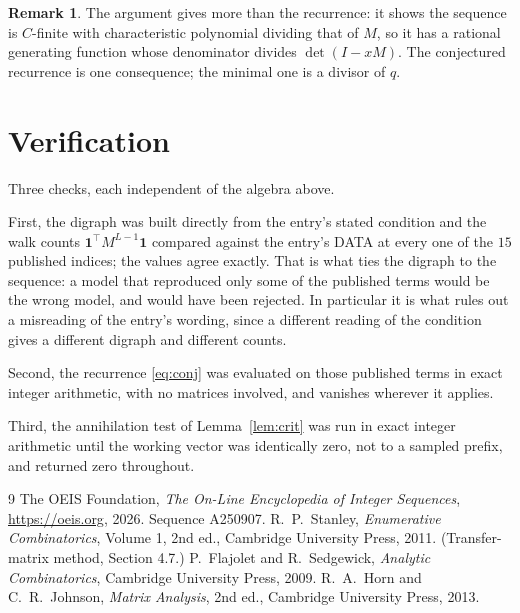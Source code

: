 \documentclass[11pt,a4paper]{article}
\theoremstyle{plain}
\theoremstyle{definition}
\newtheorem{remark}[theorem]{Remark}
\begin{document}
\begin{remark}
The argument gives more than the recurrence: it shows the sequence is $C$-finite with
characteristic polynomial dividing that of $M$, so it has a rational generating function
whose denominator divides $\det(I-xM)$. The conjectured recurrence is one consequence; the
minimal one is a divisor of $q$.
\end{remark}

\section{Verification}

Three checks, each independent of the algebra above.

First, the digraph was built directly from the entry's stated condition and the walk counts
$\mathbf{1}^{\!\top}M^{L-1}\mathbf{1}$ compared against the entry's DATA at
every one of the $15$ published indices; the values agree exactly. That is what ties
the digraph to the sequence: a model that reproduced only some of the published terms would
be the wrong model, and would have been rejected. In particular it is what rules out a
misreading of the entry's wording, since a different reading of the condition gives a
different digraph and different counts.

Second, the recurrence \eqref{eq:conj} was evaluated on those published terms in exact
integer arithmetic, with no matrices involved, and vanishes wherever it applies.

Third, the annihilation test of Lemma~\ref{lem:crit} was run in exact integer arithmetic
until the working vector was identically zero, not to a sampled prefix, and returned zero
throughout.

\begin{thebibliography}{9}
 The OEIS Foundation, \emph{The On-Line Encyclopedia of Integer
Sequences}, \url{https://oeis.org}, 2026. Sequence A250907.
 R.~P.~Stanley, \emph{Enumerative Combinatorics}, Volume 1, 2nd ed.,
Cambridge University Press, 2011. (Transfer-matrix method, Section 4.7.)
 P.~Flajolet and R.~Sedgewick, \emph{Analytic Combinatorics}, Cambridge
University Press, 2009.
 R.~A.~Horn and C.~R.~Johnson, \emph{Matrix Analysis}, 2nd ed., Cambridge
University Press, 2013.
\end{thebibliography}
\end{document}
